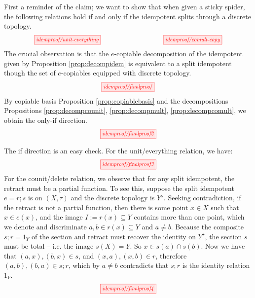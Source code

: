 \begin{myboxB}
First a reminder of the claim; we want to show that when given a sticky spider, the following relations hold if and only if the idempotent splits through a discrete topology.
\[\scalebox{0.8}{\tikzfig{idemproof/unit-everything}} \quad\quad\quad\quad\quad\quad\quad\quad \scalebox{0.8}{\tikzfig{idemproof/comult-copy}}\]
The crucial observation is that the $e$-copiable decomposition of the idempotent given by Proposition \ref{prop:decompidem} is equivalent to a split idempotent though the set of $e$-copiables equipped with discrete topology.
\[\scalebox{0.8}{\tikzfig{idemproof/finalproof}}\]
By copiable basis Proposition \ref{prop:copiablebasis} and the decompositions Propositions \ref{prop:decompcounit}, \ref{prop:decompmult}, \ref{prop:decompcomult}, we obtain the only-if direction.
\[\scalebox{0.8}{\tikzfig{idemproof/finalproof2}}\]
\end{myboxB}
\begin{myboxB}
The if direction is an easy check. For the unit/everything relation, we have:
\[\scalebox{0.8}{\tikzfig{idemproof/finalproof3}}\]
For the counit/delete relation, we observe that for any split idempotent, the retract must be a partial function. To see this, suppose the split idempotent $e = r;s$ is on $(X,\tau)$ and the discrete topology is $Y^\star$. Seeking contradiction, if the retract is not a partial function, then there is some point $x \in X$ such that $x \in e(x)$, and the image $I := r(x) \subseteq Y$ contains more than one point, which we denote and discriminate $a,b \in r(x) \subseteq Y$ and $a \neq b$. Because the composite $s;r = 1_Y$ of the section and retract must recover the identity on $Y^\star$, the section $s$ must be total -- i.e. the image $s(X) = Y$. So $x \in s(a) \cap s(b)$. Now we have that $(a,x),(b,x) \in s$, and $(x,a),(x,b) \in r$, therefore $(a,b),(b,a) \in s;r$, which by $a \neq b$ contradicts that $s;r$ is the identity relation $1_Y$.
\[\scalebox{0.8}{\tikzfig{idemproof/finalproof4}}\]
\end{myboxB}

\clearpage